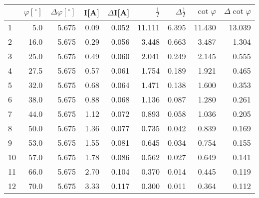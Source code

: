 \begin{tabular}{lrrrrrrrr}
\toprule
{} &  $\varphi[^\circ]$ &  $\Delta \varphi[^\circ]$ &  I[A] &  $\Delta$I[A] &  $\frac{1}{I}$ &  $\Delta \frac{1}{I}$ &  $\cot{\varphi}$ &  $\Delta \cot{\varphi}$ \\
\midrule
1  &                5.0 &                     5.675 &  0.09 &         0.052 &         11.111 &                 6.395 &           11.430 &                  13.039 \\
2  &               16.0 &                     5.675 &  0.29 &         0.056 &          3.448 &                 0.663 &            3.487 &                   1.304 \\
3  &               25.0 &                     5.675 &  0.49 &         0.060 &          2.041 &                 0.249 &            2.145 &                   0.555 \\
4  &               27.5 &                     5.675 &  0.57 &         0.061 &          1.754 &                 0.189 &            1.921 &                   0.465 \\
5  &               32.0 &                     5.675 &  0.68 &         0.064 &          1.471 &                 0.138 &            1.600 &                   0.353 \\
6  &               38.0 &                     5.675 &  0.88 &         0.068 &          1.136 &                 0.087 &            1.280 &                   0.261 \\
7  &               44.0 &                     5.675 &  1.12 &         0.072 &          0.893 &                 0.058 &            1.036 &                   0.205 \\
8  &               50.0 &                     5.675 &  1.36 &         0.077 &          0.735 &                 0.042 &            0.839 &                   0.169 \\
9  &               53.0 &                     5.675 &  1.55 &         0.081 &          0.645 &                 0.034 &            0.754 &                   0.155 \\
10  &               57.0 &                     5.675 &  1.78 &         0.086 &          0.562 &                 0.027 &            0.649 &                   0.141 \\
11 &               66.0 &                     5.675 &  2.70 &         0.104 &          0.370 &                 0.014 &            0.445 &                   0.119 \\
12 &               70.0 &                     5.675 &  3.33 &         0.117 &          0.300 &                 0.011 &            0.364 &                   0.112 \\
\bottomrule
\end{tabular}
